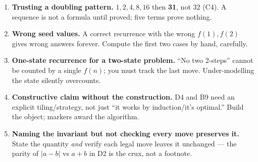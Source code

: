 \documentclass[11pt,a4paper]{article}
\begin{document}
\begin{enumerate}[leftmargin=2em, itemsep=4pt]
  \item \textbf{Trusting a doubling pattern.} $1,2,4,8,16$ then \textbf{31}, not 32 (C4). A sequence is not a formula until proved; five terms prove nothing. 
  \item \textbf{Wrong seed values.} A correct recurrence with the wrong $f(1),f(2)$ gives wrong answers forever. Compute the first two cases by hand, carefully. 
  \item \textbf{One-state recurrence for a two-state problem.} ``No two 2-steps'' cannot be counted by a single $f(n)$; you must track the last move. Under-modelling the state silently overcounts. 
  \item \textbf{Constructive claim without the construction.} D4 and B9 need an explicit tiling/strategy, not just ``it works by induction/it's optimal.'' Build the object; markers award the algorithm. 
  \item \textbf{Naming the invariant but not checking every move preserves it.} State the quantity \emph{and} verify each legal move leaves it unchanged --- the parity of $|a-b|$ vs $a+b$ in D2 is the crux, not a footnote. 
\end{enumerate}

\end{document}
